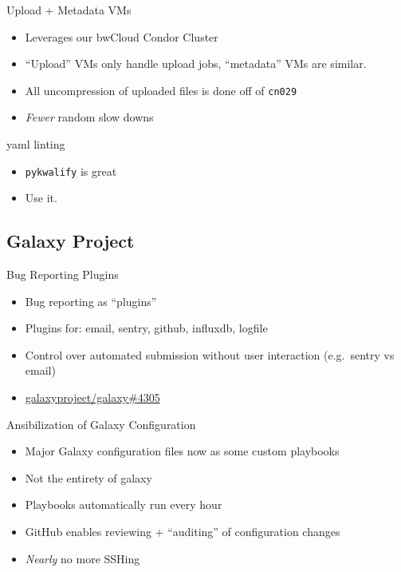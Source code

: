 \documentclass[12pt]{ufrslides}
\newcommand{\ghpr}[3]{\href{https://github.com/#1/#2/pull/#3}{#1/#2\##3}}
\begin{document}
	\begin{frame}{Upload + Metadata VMs}
		\begin{itemize}
			\item Leverages our bwCloud Condor Cluster
			\item ``Upload'' VMs only handle upload jobs, ``metadata'' VMs are similar.
			\item All uncompression of uploaded files is done off of \texttt{cn029}
			\item \emph{Fewer} random slow downs
		\end{itemize}
	\end{frame}

	\begin{frame}{yaml linting}
		\begin{itemize}
			\item \texttt{pykwalify} is great
			\item Use it.
		\end{itemize}
	\end{frame}

\subsection{Galaxy Project}
	\begin{frame}{Bug Reporting Plugins}
		\begin{itemize}
			\item Bug reporting as ``plugins''
			\item Plugins for: email, sentry, github, influxdb, logfile
			\item Control over automated submission without user interaction (e.g.~sentry vs email)
			\item \ghpr{galaxyproject}{galaxy}{4305}
		\end{itemize}
	\end{frame}

	\begin{frame}{Ansibilization of Galaxy Configuration}
		\begin{itemize}
			\item Major Galaxy configuration files now as some custom playbooks
			\item Not the entirety of galaxy
			\item Playbooks automatically run every hour
			\item GitHub enables reviewing + ``auditing'' of configuration changes
			\item \emph{Nearly} no more SSHing
		\end{itemize}
	\end{frame}
\end{document}
